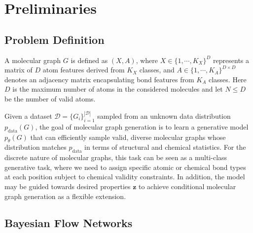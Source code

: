 \documentclass[journal,twoside,web]{ieeecolor}
\begin{document}
\section{Preliminaries}

\subsection{Problem Definition}

A molecular graph $G$ is defined as $(X, A)$, where $X \in \{1, \cdots, K_{X}\}^{D}$ represents a matrix of $D$ atom features derived from $K_X$ classes, and $A \in \{1, \cdots, K_{A}\}^{D \times D}$ denotes an adjacency matrix encapsulating bond features from $K_A$ classes. Here $D$ is the maximum number of atoms in the considered molecules and let $N \leq D$ be the number of valid atoms.

Given a dataset $\mathcal{D} = \{G_i\}_{i=1}^{|\mathcal{D}|}$ sampled from an unknown data distribution $p_{\text{data}}(G)$, the goal of molecular graph generation is to learn a generative model $p_\theta(G)$ that can efficiently sample valid, diverse molecular graphs whose distribution matches $p_{\text{data}}$ in terms of structural and chemical statistics. For the discrete nature of molecular graphs, this task can be seen as a multi-class generative task, where we need to assign specific atomic or chemical bond types at each position subject to chemical validity constraints. In addition, the model may be guided towards desired properties $\mathbf{z}$ to achieve conditional molecular graph generation as a flexible extension.



\subsection{Bayesian Flow Networks}
\label{pre_BFN}
\end{document}
